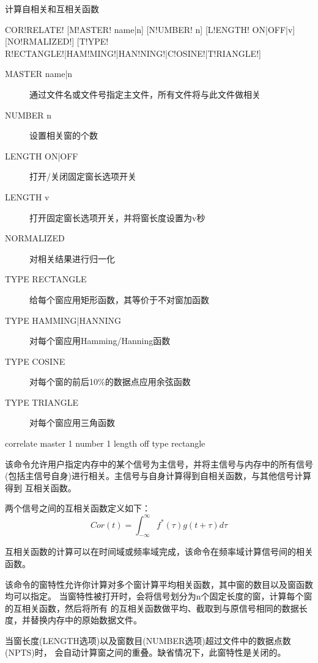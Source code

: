 \label{cmd:correlate}

计算自相关和互相关函数

\begin{SACSTX}
COR!RELATE! [M!ASTER! name|n] [N!UMBER! n] [L!ENGTH! ON|OFF|v] [NO!RMALIZED!]
    [T!YPE! R!ECTANGLE!|HAM!MING!|HAN!NING!|C!OSINE!|T!RIANGLE!]
\end{SACSTX}

\begin{description}
\item [MASTER name|n] 通过文件名或文件号指定主文件，所有文件将与此文件做相关
\item [NUMBER n] 设置相关窗的个数
\item [LENGTH ON|OFF] 打开/关闭固定窗长选项开关
\item [LENGTH v] 打开固定窗长选项开关，并将窗长度设置为v秒
\item [NORMALIZED] 对相关结果进行归一化
\item [TYPE RECTANGLE] 给每个窗应用矩形函数，其等价于不对窗加函数
\item [TYPE HAMMING|HANNING] 对每个窗应用Hamming/Hanning函数
\item [TYPE COSINE] 对每个窗的前后10\%的数据点应用余弦函数
\item [TYPE TRIANGLE] 对每个窗应用三角函数
\end{description}

\begin{SACDFT}
correlate master 1 number 1 length off type rectangle
\end{SACDFT}

该命令允许用户指定内存中的某个信号为主信号，并将主信号与内存中的所有信号
(包括主信号自身)进行相关。主信号与自身计算得到自相关函数，与其他信号计算得到
互相关函数。

两个信号之间的互相关函数定义如下：
\[ Cor(t) = \int_{-\infty} ^\infty f^*(\tau)g(t+\tau)d\tau \]

互相关函数的计算可以在时间域或频率域完成，该命令在频率域计算信号间的相关函数。

该命令的窗特性允许你计算对多个窗计算平均相关函数，其中窗的数目以及窗函数均可以指定。
当窗特性被打开时，会将信号划分为n个固定长度的窗，计算每个窗的互相关函数，然后将所有
的互相关函数做平均、截取到与原信号相同的数据长度，并替换内存中的原始数据文件。

当窗长度(LENGTH选项)以及窗数目(NUMBER选项)超过文件中的数据点数(NPTS)时，
会自动计算窗之间的重叠。缺省情况下，此窗特性是关闭的。

